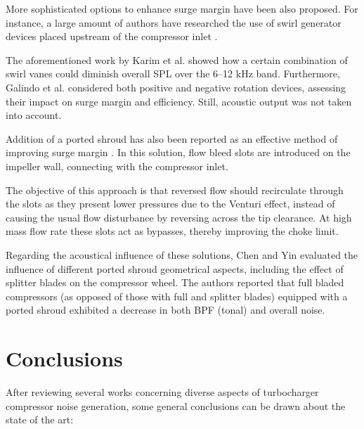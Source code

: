 More sophisticated options to enhance surge margin have been also proposed. For instance, a large amount of authors have researched the use of swirl generator devices placed upstream of the compressor inlet \cite{kyrtatos1980application,coppinger2000performance}. 

The aforementioned work by Karim et al. \cite{karim2013computational} showed how a certain combination of swirl vanes could diminish overall SPL over the 6--12 kHz band. Furthermore, Galindo et al. \cite{galindo2007potential} considered both positive and negative rotation devices, assessing their impact on surge margin and efficiency. Still, acoustic output was not taken into account.

Addition of a ported shroud has also been reported as an effective method of improving surge margin \cite{guillou2010characterization,semlitsch2014numerical}. In this solution, flow bleed slots are introduced on the impeller wall, connecting with the compressor inlet. 

The objective of this approach is that reversed flow should recirculate through the slots as they present lower pressures due to the Venturi effect, instead of causing the usual flow disturbance by reversing across the tip clearance. At high mass flow rate these slots act as bypasses, thereby improving the choke limit. 

Regarding the acoustical influence of these solutions, Chen and Yin \cite{chen2006turboc} evaluated the influence of different ported shroud geometrical aspects, including the effect of splitter blades on the compressor wheel. The authors reported that full bladed compressors (as opposed of those with full and splitter blades) equipped with a ported shroud exhibited a decrease in both BPF (tonal) and overall noise.

\section{Conclusions}

After reviewing several works concerning diverse aspects of turbocharger compressor noise generation, some general conclusions can be drawn about the state of the art:

